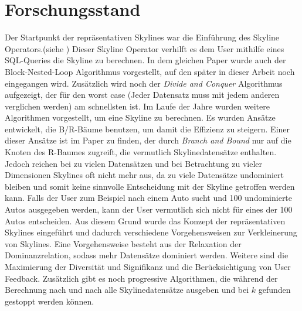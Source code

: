 \chapter{Forschungsstand}
\label{ch:Forschungsstand}
Der Startpunkt der repräsentativen Skylines war die Einführung des Skyline Operators.(siehe \cite{borzsony2001skyline}) Dieser Skyline Operator verhilft es dem User mithilfe eines SQL-Queries die Skyline zu berechnen. In dem gleichen Paper wurde auch der Block-Nested-Loop Algorithmus vorgestellt, auf den später in dieser Arbeit noch eingegangen wird. Zusätzlich wird noch der \textit{Divide and Conquer} Algorithmus aufgezeigt, der für den worst case (Jeder Datensatz muss mit jedem anderen verglichen werden) am schnellsten ist.  Im Laufe der Jahre wurden weitere Algorithmen vorgestellt, um eine Skyline zu berechnen. Es wurden Ansätze entwickelt, die B/R-Bäume benutzen, um damit die Effizienz zu steigern. Einer dieser Ansätze ist im Paper \cite{Papadias:2003:OPA:872757.872814} zu finden, der durch \textit{Branch and Bound} nur auf die Knoten des R-Baumes zugreift, die vermutlich Skylinedatensätze enthalten. 
Jedoch reichen bei zu vielen Datensätzen und bei Betrachtung zu vieler Dimensionen Skylines oft nicht mehr aus, da zu viele Datensätze undominiert bleiben und somit keine sinnvolle Entscheidung mit der Skyline getroffen werden kann. Falls der User zum Beispiel nach einem Auto sucht und 100 undominierte Autos ausgegeben werden, kann der User vermutlich sich nicht für eines der 100 Autos entscheiden.
Aus diesem Grund wurde das Konzept der repräsentativen Skylines eingeführt und dadurch verschiedene Vorgehensweisen zur Verkleinerung von Skylines. 
Eine Vorgehensweise besteht aus der Relaxation der Dominanzrelation, sodass mehr Datensätze dominiert werden. Weitere sind die Maximierung der Diversität und Signifikanz und die Berücksichtigung von User Feedback. Zusätzlich gibt es noch progressive Algorithmen, die während der Berechnung nach und nach alle Skylinedatensätze ausgeben und bei $k$ gefunden gestoppt werden können.
